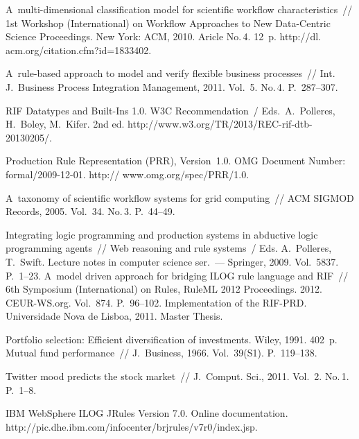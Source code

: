 \begin{multicols}{2}
{{\begin{thebibliography}{99}
A~multi-dimensional classification model for scientific workflow characteristics~//
1st  Workshop (International) on Workflow Approaches to New Data-Centric Science
Proceedings.  New York: ACM, 2010. Aricle No.\,4. 12~p.
{\sf http://dl. acm.org/citation.cfm?id=1833402}.
\pagebreak

A~rule-based approach to model and verify flexible business processes~//
Int. J.~Business Process Integration Management, 2011. Vol.~5. No.\,4. P.~287--307.

RIF Datatypes and Built-Ins 1.0. W3C Recommendation~/
Eds.\ A.~Polleres, H.~Boley, M.~Kifer. 2nd ed.
{\sf http://www.w3.org/TR/2013/REC-rif-dtb-20130205/}.




Production Rule Representation (PRR), Version~1.0.
OMG Document Number: formal/2009-12-01. {\sf http:// www.omg.org/spec/PRR/1.0}.

 A~taxonomy of scientific workflow systems for grid computing~//
 ACM SIGMOD Records, 2005. Vol.~34. No.\,3. P.~44--49.

Integrating logic programming and production systems in abductive logic programming
agents~//
Web reasoning and rule systems~/ Eds. A.~Polleres, T.~Swift.
Lecture notes in computer science ser.~--- Springer, 2009. Vol.~5837. P.~1--23.
 A~model driven approach for bridging ILOG rule language and RIF~//
 6th  Symposium (International) on Rules, RuleML 2012 Proceedings.  2012.
 CEUR-WS.org. Vol.~874. P.~96--102.
Implementation of the RIF-PRD. Universidade Nova de Lisboa, 2011. Master Thesis.


Portfolio selection: Efficient diversification of investments. Wiley, 1991.
402~p.
Mutual fund performance~// J.~Business, 1966. Vol.~39(S1). P.~119--138.

Twitter mood predicts the stock market~// J.~Comput. Sci., 2011. Vol.~2. No.\,1.
P.~1--8.

IBM WebSphere ILOG JRules Version 7.0. Online documentation.
{\sf http://pic.dhe.ibm.com/infocenter/\linebreak brjrules/v7r0/index.jsp}.


\end{thebibliography}}}
\end{multicols}
